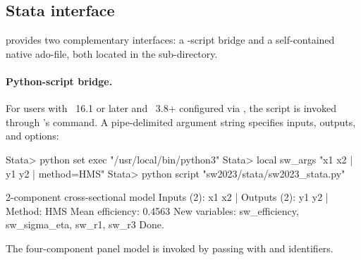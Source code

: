\documentclass[article]{jss}
\begin{document}
\subsection{Stata interface}
\label{sec:stata}

 provides two complementary  interfaces:
a -script bridge and a self-contained native ado-file,
both located in the  sub-directory.

\paragraph{Python-script bridge.}
For users with ~16.1 or later and ~3.8+
configured via , the script 
is invoked through 's  command.
A pipe-delimited argument string specifies inputs, outputs, and options:
%
\begin{CodeChunk}
\begin{CodeInput}
Stata> python set exec "/usr/local/bin/python3"
Stata> local sw_args "x1 x2 | y1 y2 | method=HMS"
Stata> python script "sw2023/stata/sw2023_stata.py"
\end{CodeInput}
\begin{CodeOutput}
[SW2023] 2-component cross-sectional model
  Inputs (2): x1 x2  |  Outputs (2): y1 y2  |  Method: HMS
  Mean efficiency: 0.4563
  New variables: sw_efficiency, sw_sigma_eta, sw_r1, sw_r3
  Done.
\end{CodeOutput}
\end{CodeChunk}
%
The four-component panel model is invoked by passing 
with  and  identifiers.
\end{document}
